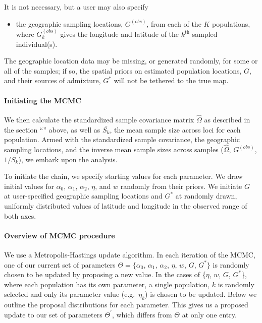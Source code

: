 \documentclass[12pt]{article}
\newcommand{\identifyadmixsource}[1]{{#1^{*}}}
\newcommand{\secref}[1]{``\nameref{#1}''}
\begin{document}
It is not necessary, but a user may also specify 
\begin{itemize}
  \item the geographic sampling locations, $G^{(obs)}$, from each of the $K$ populations, where $G^{(obs)}_k$ gives the longitude and latitude of the $k^\mathrm{th}$ sampled individual(s).
\end{itemize}

The geographic location data may be missing, or generated randomly, for some or all of the samples; if so, the spatial priors on estimated population locations, $G$, and their sources of admixture, $\identifyadmixsource{G}$ will not be tethered to the true map. 

\paragraph{Initiating the MCMC}
We then calculate the standardized sample covariance matrix $\widehat{\Omega}$ as described in the section \secref{ss:cov_methods} above,
as well as $\bar{S_k}$, the mean sample size across loci for each population.
Armed with the standardized sample covariance, the geographic sampling locations, and the inverse mean sample sizes across samples ($\widehat{\Omega}$, $G^{(obs)}$, $1/\bar{S_k}$), we embark upon the analysis.

To initiate the chain, we specify starting values for each parameter.  We draw initial values for $\alpha_0$, $\alpha_1$, $\alpha_2$, $\eta$, and $w$ randomly from their priors.  We initiate $G$ at user-specified geographic sampling locations and $\identifyadmixsource{G}$ at randomly drawn, uniformly distributed values of latitude and longitude in the observed range of both axes.  

\paragraph{Overview of MCMC procedure}
We use a Metropolis-Hastings update algorithm. 
In each iteration of the MCMC, one of our current set of parameters 
$\Theta= \{\alpha_0$, $\alpha_1$, $\alpha_2$, $\eta$, $w$, $G$, $\identifyadmixsource{G}\}$ 
is randomly chosen to be updated by proposing a new value.  
In the cases of \{$\eta$, $w$, $G$, $\identifyadmixsource{G}$\}, where each population has its own parameter, a single population, $k$ 
is randomly selected and only its parameter value (e.g.\ $\eta_k$) is chosen to be updated. 
Below we outline the proposal distributions for each parameter. 
This gives us a proposed update to our set of parameters $\Theta^{\prime}$, which differs from $\Theta$ at only one entry.
\end{document}

